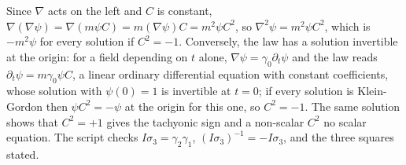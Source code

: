 Since $\nabla$ acts on the left and $C$ is constant, $\nabla(\nabla\psi) = \nabla(m\psi C) = m(\nabla\psi)C = m^{2}\psi C^{2}$, so $\nabla^{2}\psi = m^{2}\psi C^{2}$, which is $-m^{2}\psi$ for every solution if $C^{2} = -1$. Conversely, the law has a solution invertible at the origin: for a field depending on $t$ alone, $\nabla\psi = \gamma_{0}\partial_{t}\psi$ and the law reads $\partial_{t}\psi = m\gamma_{0}\psi C$, a linear ordinary differential equation with constant coefficients, whose solution with $\psi(0) = 1$ is invertible at $t = 0$; if every solution is Klein-Gordon then $\psi C^{2} = -\psi$ at the origin for this one, so $C^{2} = -1$. The same solution shows that $C^{2} = +1$ gives the tachyonic sign and a non-scalar $C^{2}$ no scalar equation. The script checks $I\sigma_{3} = \gamma_{2}\gamma_{1}$, $(I\sigma_{3})^{-1} = -I\sigma_{3}$, and the three squares stated.
